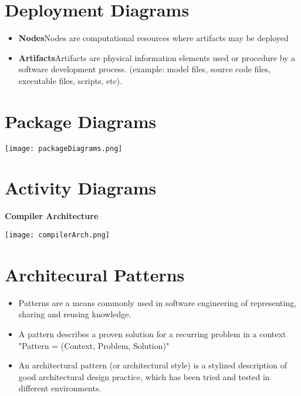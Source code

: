 \documentclass[../ESOF_notes.tex]{subfiles}
\begin{document}
\section{Deployment Diagrams}
\begin{itemize}
    \item \textbf{Nodes}\newline Nodes are computational resources where artifacts may be deployed
    \item \textbf{Artifacts}\newline Artifacts are physical information elements used or procedure by a software development process. (example: model files, source code files, executable files, scripts, etc).
\end{itemize}

\section{Package Diagrams}
    \begin{center}
    \texttt{[image: packageDiagrams.png]}    
    \end{center}
    
\section{Activity Diagrams}
    \textbf{Compiler Architecture}
    \begin{center}
    \texttt{[image: compilerArch.png]}    
    \end{center}

\newpage

\section{Architecural Patterns}
    \begin{itemize}
        \item Patterns are a means commonly used in software engineering of representing, sharing and reusing knowledge.
        \item A pattern describes a proven solution for a recurring problem in a context "Pattern = (Context, Problem, Solution)"
        \item An architectural pattern (or architectural style) is a stylized description of good architectural design practice, which has been tried and tested in different environments.
    \end{itemize}
    
\end{document}
